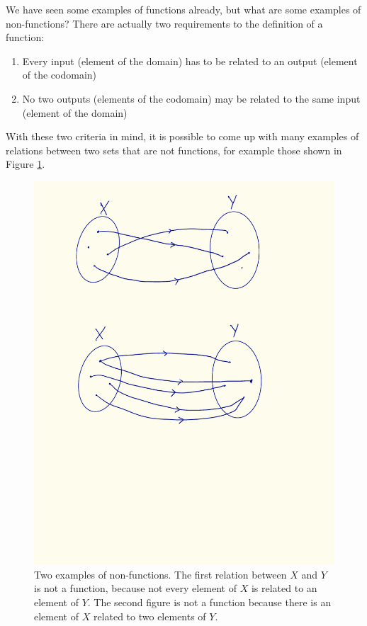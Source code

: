         We have seen some examples of functions already, but what are some examples of non-functions? There are actually two requirements to the definition of a function:
        \begin{enumerate}
            \item Every input (element of the domain) has to be related to an output (element of the codomain)
            \item No two outputs (elements of the codomain) may be related to the same input (element of the domain)
        \end{enumerate}
        With these two criteria in mind, it is possible to come up with many examples of relations between two sets that are not functions, for example those shown in Figure \ref{fig:non_functions}.
        \begin{figure}[H] \centering
            \includegraphics{images/non_functions}
            \caption{Two examples of non-functions. The first relation between $X$ and $Y$ is not a function, because not every element of $X$ is related to an element of $Y$. The second figure is not a function because there is an element of $X$ related to two elements of $Y$.}
            \label{fig:non_functions}
        \end{figure}

